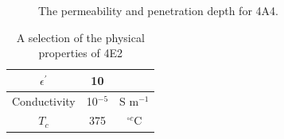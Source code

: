 \begin{figure}
\caption{The permeability  and penetration depth  for 4A4.}
\end{figure}

\begin{table}
\caption{A selection of the physical properties of 4E2}
\label{tab:4e2Prop}
\begin{center}
\begin{tabular}{c | c | c}
$\epsilon^{'}$ & 10 & \\ \hline
Conductivity  & 10$^{-5}$ & S m$^{-1}$\\ \hline
$T_{c}$ & 375 & $^{\circ c}$C \\
\end{tabular}
\end{center}
\end{table}

